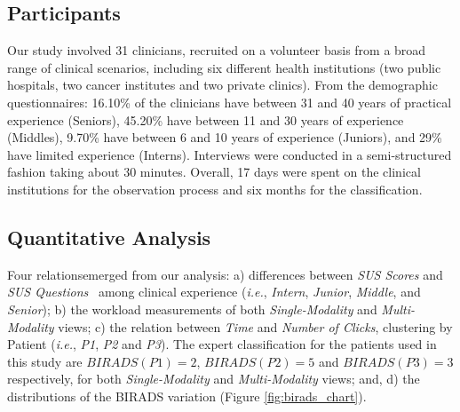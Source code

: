 \subsection{Participants}

Our study involved 31 clinicians, recruited on a volunteer basis from a broad range of clinical scenarios, including six different health institutions (two public hospitals, two cancer institutes and two private clinics).
From the demographic questionnaires: 16.10\% of the clinicians have between 31 and 40 years of practical experience (Seniors), 45.20\% have between 11 and 30 years of experience (Middles), 9.70\% have between 6 and 10 years of experience (Juniors), and 29\% have limited experience (Interns).
Interviews were conducted in a semi-structured fashion taking about 30 minutes.
Overall, 17 days were spent on the clinical institutions for the observation process and six months for the classification.

\subsection{Quantitative Analysis}

Four relations\footnotemark[2] emerged from our analysis:
a) differences between \textit{SUS Scores} and \textit{SUS Questions}~\cite{Tyllinen:2016:WNN:2858036.2858570} among clinical experience ({\em i.e.}, \textit{Intern}, \textit{Junior}, \textit{Middle}, and \textit{Senior});
b) the workload measurements of both \textit{Single-Modality} and \textit{Multi-Modality} views;
c) the relation between \textit{Time} and \textit{Number of Clicks}, clustering by Patient ({\em i.e.}, \textit{P1}, \textit{P2} and \textit{P3}).
The expert classification for the patients used in this study are $BIRADS(P1) = 2$, $BIRADS(P2) = 5$ and $BIRADS(P3) = 3$ respectively, for both \textit{Single-Modality} and \textit{Multi-Modality} views; and, d) the distributions of the BIRADS variation (Figure \ref{fig:birads_chart}).


